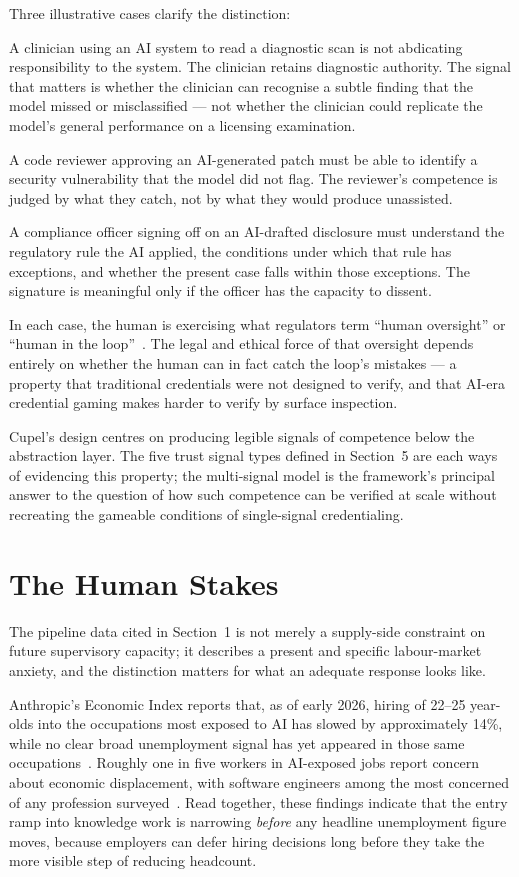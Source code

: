 \documentclass[11pt,a4paper]{article}
\begin{document}
Three illustrative cases clarify the distinction:

A clinician using an AI system to read a diagnostic scan is not abdicating responsibility to the
system. The clinician retains diagnostic authority. The signal that matters is whether the
clinician can recognise a subtle finding that the model missed or misclassified — not whether the
clinician could replicate the model's general performance on a licensing examination.

A code reviewer approving an AI-generated patch must be able to identify a security vulnerability
that the model did not flag. The reviewer's competence is judged by what they catch, not by what
they would produce unassisted.

A compliance officer signing off on an AI-drafted disclosure must understand the regulatory rule
the AI applied, the conditions under which that rule has exceptions, and whether the present case
falls within those exceptions. The signature is meaningful only if the officer has the capacity
to dissent.

In each case, the human is exercising what regulators term ``human oversight'' or ``human in the
loop''~\cite{euaiact2024}. The legal and ethical force of that oversight depends entirely on
whether the human can in fact catch the loop's mistakes — a property that traditional credentials
were not designed to verify, and that AI-era credential gaming makes harder to verify by surface
inspection.

Cupel's design centres on producing legible signals of competence below the abstraction layer.
The five trust signal types defined in Section~5 are each ways of evidencing this property; the
multi-signal model is the framework's principal answer to the question of how such competence
can be verified at scale without recreating the gameable conditions of single-signal credentialing.

\section{The Human Stakes}

The pipeline data cited in Section~1 is not merely a supply-side constraint on future supervisory
capacity; it describes a present and specific labour-market anxiety, and the distinction matters
for what an adequate response looks like.

Anthropic's Economic Index reports that, as of early 2026, hiring of 22–25 year-olds into the
occupations most exposed to AI has slowed by approximately 14\%, while no clear broad unemployment
signal has yet appeared in those same occupations~\cite{aei2026}. Roughly one in five workers in
AI-exposed jobs report concern about economic displacement, with software engineers among the most
concerned of any profession surveyed~\cite{aei2026}. Read together, these findings indicate that
the entry ramp into knowledge work is narrowing \emph{before} any headline unemployment figure
moves, because employers can defer hiring decisions long before they take the more visible step of
reducing headcount.
\end{document}
